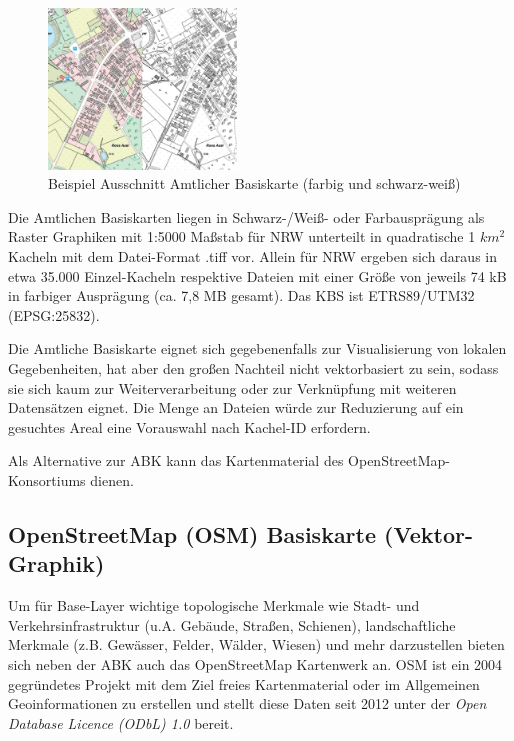 			\begin{figure}
				\includegraphics[width=5cm]{Medien/own/screen_example_ABK.png}
				\caption{Beispiel Ausschnitt Amtlicher Basiskarte (farbig und schwarz-weiß) \cite{web_bezreg_koeln_alkis_abk}}
				\label{fig:ABK_example}
			\end{figure}

			Die Amtlichen Basiskarten liegen in Schwarz-/Weiß- oder Farbausprägung als Raster Graphiken mit 1:5000 Maßstab für NRW unterteilt in quadratische 1 $km^2$ Kacheln mit dem Datei-Format .tiff vor. Allein für NRW ergeben sich daraus in etwa 35.000 Einzel-Kacheln respektive Dateien mit einer Größe von jeweils 74 kB in farbiger Ausprägung (ca. 7,8 MB gesamt). Das KBS ist ETRS89/UTM32 (EPSG:25832). \cite{web_download_opengeodata_nrw}
			
			Die Amtliche Basiskarte eignet sich gegebenenfalls zur Visualisierung von lokalen Gegebenheiten, hat aber den großen Nachteil nicht vektorbasiert zu sein, sodass sie sich kaum zur Weiterverarbeitung oder zur Verknüpfung mit weiteren Datensätzen eignet. Die Menge an Dateien würde zur Reduzierung auf ein gesuchtes Areal eine Vorauswahl nach Kachel-ID erfordern. 
			
			Als Alternative zur ABK kann das Kartenmaterial des OpenStreetMap-Konsortiums dienen.

		\subsection{OpenStreetMap (OSM) Basiskarte (Vektor-Graphik)}	
			Um für Base-Layer wichtige topologische Merkmale wie Stadt- und Verkehrsinfrastruktur (u.A. Gebäude, Straßen, Schienen), landschaftliche Merkmale (z.B. Gewässer, Felder, Wälder, Wiesen) und mehr darzustellen bieten sich neben der ABK auch das OpenStreetMap Kartenwerk an. OSM ist ein 2004 gegründetes Projekt mit dem Ziel freies Kartenmaterial oder im Allgemeinen Geoinformationen zu erstellen und stellt diese Daten seit 2012 unter der \textit{Open Database Licence (ODbL) 1.0} bereit. \cite{web_osm_de}
			

